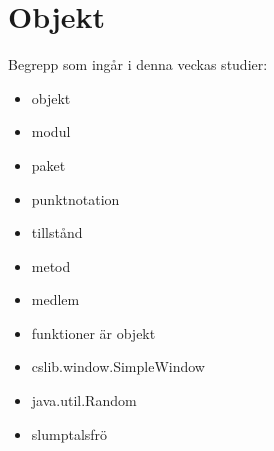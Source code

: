\chapter{Objekt}\label{chapter:W04}
Begrepp som ingår i denna veckas studier:
\begin{itemize}[noitemsep,label={$\square$},leftmargin=*]
\item objekt
\item modul
\item paket
\item punktnotation
\item tillstånd
\item metod
\item medlem
\item funktioner är objekt
\item cslib.window.SimpleWindow
\item java.util.Random
\item slumptalsfrö\end{itemize}
